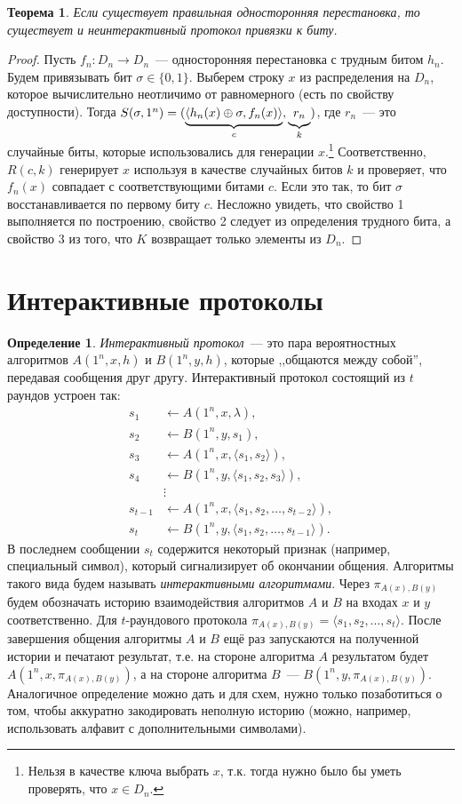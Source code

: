 \documentclass[12pt,a4paper]{article}
\newcommand{\bits}{\{0,1\}}
\theoremstyle{definition}
\newtheorem{definition}{Определение}[section]
\theoremstyle{plain}
\newtheorem{theorem}{Теорема}[section]
\theoremstyle{remark}
\begin{document}
\begin{theorem}
Если существует правильная односторонняя перестановка, то существует и 
неинтерактивный протокол привязки к биту.
\end{theorem}
\begin{proof}
Пусть $f_n : D_n\to D_n$~--- односторонняя перестановка с трудным битом $h_n$.
Будем привязывать бит $\sigma\in\bits$. Выберем строку $x$ из распределения 
на $D_n$, которое вычислительно неотличимо от равномерного (есть по свойству доступности).
Тогда $S(\sigma, 1^n) = (\underbrace{\strut\langle h_n(x)\oplus \sigma, f_n(x)\rangle}_{c}, \underbrace{\strut r_n}_{k})$, где $r_n$~--- это случайные биты, которые использовались для генерации $x$.\footnote{Нельзя в качестве ключа выбрать $x$, т.к. тогда нужно было бы уметь проверять, что $x\in D_n$.} Соответственно, $R(c, k)$ генерирует $x$ используя в качестве случайных битов $k$ и проверяет, что $f_n(x)$ совпадает с соответствующими битами $c$. Если это так, то бит $\sigma$ восстанавливается по первому биту $c$. Несложно увидеть, что свойство 1 выполняется по построению, свойство 2 следует из определения трудного бита, а свойство 3 из того, что $K$ возвращает только элементы из $D_n$.
\end{proof}

\section{Интерактивные протоколы}
\begin{definition}
\emph{Интерактивный протокол}~--- это пара вероятностных алгоритмов $A(1^n, x, h)$ и $B(1^n, y, h)$,
которые ,,общаются между собой'', передавая сообщения друг другу.
Интерактивный протокол состоящий из $t$ раундов устроен так:
\begin{align*}
s_1&\gets A(1^n, x, \lambda),\\
s_2&\gets B(1^n, y, s_1),\\
s_3&\gets A(1^n, x, \langle s_1, s_2\rangle),\\
s_4&\gets B(1^n, y, \langle s_1, s_2, s_3\rangle),\\
&\vdots\\
s_{t-1}&\gets A(1^n, x, \langle s_1, s_2,\dotsc,s_{t-2}\rangle),\\
s_{t}  &\gets B(1^n, y, \langle s_1, s_2,\dotsc,s_{t-1}\rangle).
\end{align*}
В последнем сообщении $s_t$ содержится некоторый признак (например, специальный символ),
который сигнализирует об окончании общения.
Алгоритмы такого вида будем называть \emph{интерактивными алгоритмами}.
Через $\pi_{A(x),B(y)}$ будем обозначать историю взаимодействия алгоритмов $A$ и $B$
на входах $x$ и $y$ соответственно. Для $t$-раундового протокола $\pi_{A(x),B(y)} = \langle s_1, s_2,\dotsc,s_{t}\rangle$. После завершения общения алгоритмы $A$ и $B$ ещё раз запускаются 
на полученной истории и печатают результат, т.е. на стороне алгоритма $A$ результатом будет
$A(1^n, x, \pi_{A(x),B(y)})$, а на стороне алгоритма $B$~--- $B(1^n, y, \pi_{A(x),B(y)})$. 
Аналогичное определение можно дать и для схем, нужно только позаботиться о том, чтобы аккуратно
закодировать неполную историю (можно, например, использовать алфавит с дополнительными символами).
\end{definition}
\end{document}
